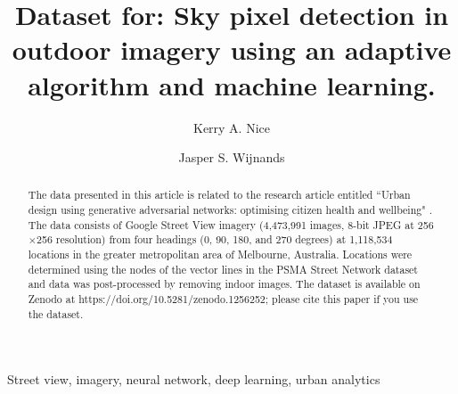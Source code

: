 \documentclass[final,3p,times,authoryear]{elsarticle}
\begin{document}
\begin{frontmatter}



\title{Dataset for: Sky pixel detection in outdoor imagery using an adaptive algorithm and machine learning.} 

\author[melb]{Kerry A. Nice}
\author[melb]{Jasper S. Wijnands}
\address[melb]{Transport, Health and Urban Design, Melbourne School of Design, The University of Melbourne, Parkville VIC 3010, Australia}


\begin{abstract}

The data presented in this article is related to the research article entitled ``Urban design using generative adversarial networks: optimising citizen health and wellbeing" \citep{wijnands2018urban}. The data consists of Google Street View imagery (4,473,991 images, 8-bit JPEG at 256$\times$256 resolution) from four headings (0, 90, 180, and 270 degrees) at 1,118,534 locations in the greater metropolitan area of Melbourne, Australia. Locations were determined using the nodes of the vector lines in the PSMA Street Network dataset \citep{PSMA2018} and data was post-processed by removing indoor images. The dataset is available on Zenodo at https://doi.org/10.5281/zenodo.1256252; please cite this paper if you use the dataset.

\end{abstract}

\begin{keyword}
Street view, imagery, neural network, deep learning, urban analytics
\end{keyword}

\end{frontmatter}
\end{document}
